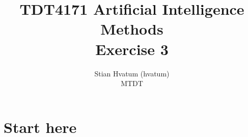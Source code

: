 \documentclass[english]{article}
\title{TDT4171 Artificial Intelligence Methods\\
\Huge Exercise 3}
\author{Stian Hvatum (hvatum)\\MTDT}
\begin{document}
\maketitle
{}
\newpage
\section{Start here}
\end{document}
